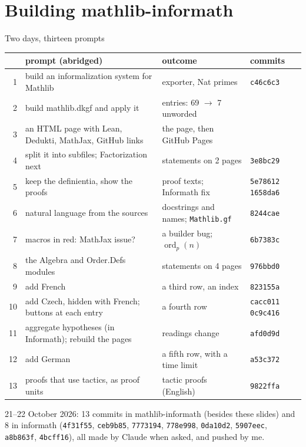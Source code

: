 \documentclass[10pt,aspectratio=169]{beamer}
\newcommand{\commit}[1]{\texttt{\footnotesize #1}}
\begin{document}
\section{Building mathlib-informath}

\begin{frame}{Two days, thirteen prompts}
  \small
  \scriptsize\begin{tabular}{@{}r>{\raggedright\arraybackslash}p{}>{\raggedright\arraybackslash}p{}l@{}}
    \toprule
    & prompt (abridged) & outcome & commits \\
    \midrule
    1 & build an informalization system for Mathlib & exporter, Nat primes & \commit{c46c6c3} \\
    2 & build mathlib.dkgf and apply it & 17 entries: 69 $\to$ 7 unworded & \\
    3 & an HTML page with Lean, Dedukti, MathJax, GitHub links & the page, then GitHub Pages & \\
    4 & split it into subfiles; Factorization next & 322 statements on 2 pages & \commit{3e8bc29} \\
    5 & keep the definientia, show the proofs & 84 proof texts; Informath fix & \commit{5e78612} \commit{1658da6} \\
    6 & natural language from the sources & docstrings and names; \texttt{Mathlib.gf} & \commit{8244cae} \\
    7 & macros in red: MathJax issue? & a builder bug; $\operatorname{ord}_p(n)$ & \commit{6b7383c} \\
    8 & the Algebra and Order.Defs modules & 705 statements on 4 pages & \commit{976bbd0} \\
    9 & add French & a third row, an index & \commit{823155a} \\
    10 & add Czech, hidden with French; buttons at each entry & a fourth row & \commit{cacc011} \commit{0c9c416} \\
    11 & aggregate hypotheses (in Informath); rebuild the pages & 503 readings change & \commit{afd0d9d} \\
    12 & add German & a fifth row, with a time limit & \commit{a53c372} \\
    13 & proofs that use tactics, as proof units & 25 tactic proofs (English) & \commit{9822ffa} \\
    \bottomrule
  \end{tabular}

  \vspace{2mm}
  \footnotesize 21--22 October 2026: 13 commits in mathlib-informath (besides these slides)
  and 8 in informath (\commit{4f31f55}, \commit{ceb9b85}, \commit{7773194},
  \commit{778e998}, \commit{0da10d2}, \commit{5907eec}, \commit{a8b863f}, \commit{4bcff16}),
  all made by Claude when asked, and pushed by me.
\end{frame}
\end{document}
